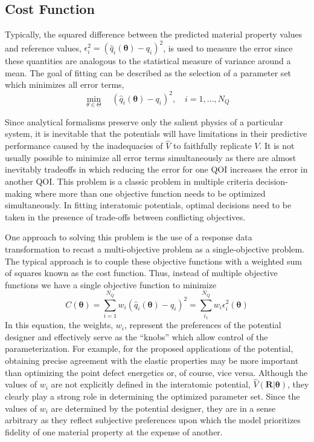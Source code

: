 \subsection{Cost Function}
\label{subsec:cost_function}

Typically, the squared difference between the predicted material property values and reference values, $\epsilon_i^2=(\hat{q}_i(\bm{\theta})-q_i)^2$, is used to measure the error since these quantities are analogous to the statistical measure of variance around a mean. The goal of fitting can be described as the selection of a parameter set which minimizes all error terms,
\begin{equation}
\label{eq:moo_LS}
	\min_{\theta\in\Theta}
		  \quad  (\hat{q}_i(\bm{\theta})-q_i)^2,
						\quad i = 1,...,N_Q
\end{equation}

Since analytical formalisms preserve only the salient physics of a particular system, it is inevitable that the potentials will have limitations in their predictive performance caused by the inadequacies of $\hat{V}$ to faithfully replicate $V$.  It is not usually possible to minimize all error terms simultaneously as there are almost inevitably tradeoffs in which reducing the error for one QOI increases the error in another QOI.  This problem is a classic problem in multiple criteria decision-making where more than one objective function needs to be optimized simultaneously\cite{miettinen1998_mcdm}.  In fitting interatomic potentials, optimal decisions need to be taken in the presence of trade-offs between conflicting objectives.

One approach to solving this problem is the use of a response data transformation to recast a multi-objective problem as a single-objective problem.  The typical approach is to couple these objective functions with a weighted sum of squares known as the cost function. Thus, instead of multiple objective functions we have a single objective function to minimize
\begin{equation}
	\label{eq:cost_function_LS}
	C(\bm{\theta})
	=\sum_{i=1}^{N_Q}
	      w_i(\hat{q}_i(\bm{\theta})-q_i)^2
	=\sum_{i_1}^{N_Q}
	      w_i \epsilon_i^2(\bm{\theta})
\end{equation}
In this equation, the weights, $w_i$, represent the preferences of the potential designer and effectively serve as the “knobs” which allow control of the parameterization. For example, for the proposed applications of the potential, obtaining precise agreement with the elastic properties may be more important than optimizing the point defect energetics or, of course, vice versa. Although the values of $w_i$ are not explicitly defined in the interatomic potential, $\hat{V}(\bm{R}|\bm{\theta})$, they clearly play a strong role in determining the optimized parameter set.  Since the values of $w_i$ are determined by the potential designer, they are in a sense arbitrary as they reflect subjective preferences upon which the model prioritizes fidelity of one material property at the expense of another.

